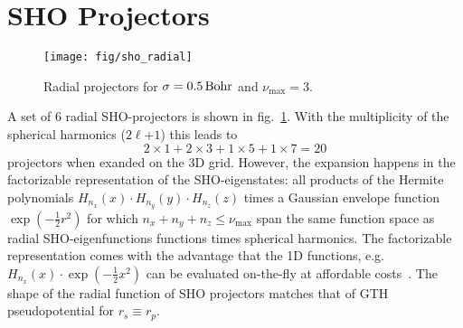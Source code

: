 \documentclass[oribibl]{llncs}
\newcommand{\um}[1]{_{\mathrm{#1}}}
\begin{document}
\newpage

\section{SHO Projectors}

%
\begin{figure}
  \begin{minipage}[c]{.990\textwidth}
	\texttt{[image: fig/sho\_radial]} %
  \end{minipage}\hfill
  \begin{minipage}[c]{.009\textwidth}
  \end{minipage}
  \label{fig:sho-radial-projectors}
  \caption{
  Radial projectors for $\sigma = \unit[0.5]{Bohr}$ and $\nu\um{max} = 3$.
  }
\end{figure}
%
%
A set of $6$ radial \ac{SHO}-projectors is shown in fig.~\ref{fig:sho-radial-projectors}.
With the multiplicity of the spherical harmonics ($2\ell$+$1$) this leads to 
$$2 \times 1 + 2 \times 3 + 1 \times 5 + 1 \times 7 = 20$$
projectors when exanded on the 3D grid.
However, the expansion happens in the factorizable representation of the
\ac{SHO}-eigenstates: all products of the Hermite polynomials 
$H_{n_x}(x) \cdot H_{n_y}(y) \cdot H_{n_z}(z)$ 
times a Gaussian envelope function $\exp(-\frac12 r^2)$
for which $n_x + n_y + n_z \leq \nu\um{max}$ span the same function space
as radial \ac{SHO}-eigenfunctions functions times spherical harmonics.
The factorizable representation comes with the advantage that the 1D functions,
e.g.~$H_{n_x}(x) \cdot \exp(-\frac 12 x^2)$ can be evaluated on-the-fly 
at affordable costs~\cite{BaumeisterTsukamotoPASC19}.
The shape of the radial function of \ac{SHO} projectors
matches that of GTH pseudopotential\cite{PhysRevB.54.1703}
for $r_s \equiv r_p$.
\end{document}
